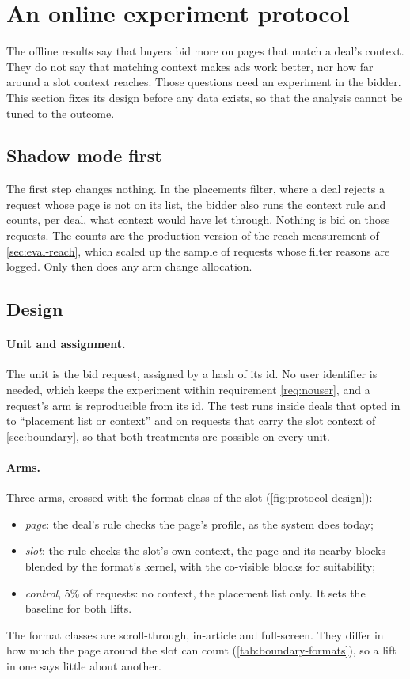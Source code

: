 \section{An online experiment protocol}\label{sec:protocol}

The offline results say that buyers bid more on pages that match a deal's context. They do not say that matching context makes ads work better, nor how far around a slot context reaches. Those questions need an experiment in the bidder. This section fixes its design before any data exists, so that the analysis cannot be tuned to the outcome.

\subsection{Shadow mode first}\label{sec:protocol-shadow}

The first step changes nothing. In the placements filter, where a deal rejects a request whose page is not on its list, the bidder also runs the context rule and counts, per deal, what context would have let through. Nothing is bid on those requests. The counts are the production version of the reach measurement of \cref{sec:eval-reach}, which scaled up the sample of requests whose filter reasons are logged. Only then does any arm change allocation.

\subsection{Design}\label{sec:protocol-design}

\paragraph{Unit and assignment.} The unit is the bid request, assigned by a hash of its id. No user identifier is needed, which keeps the experiment within requirement \ref{req:nouser}, and a request's arm is reproducible from its id. The test runs inside deals that opted in to ``placement list or context'' and on requests that carry the slot context of \cref{sec:boundary}, so that both treatments are possible on every unit.

\paragraph{Arms.} Three arms, crossed with the format class of the slot (\cref{fig:protocol-design}):
\begin{itemize}
\item \emph{page}: the deal's rule checks the page's profile, as the system does today;
\item \emph{slot}: the rule checks the slot's own context, the page and its nearby blocks blended by the format's kernel, with the co-visible blocks for suitability;
\item \emph{control}, 5\% of requests: no context, the placement list only. It sets the baseline for both lifts.
\end{itemize}
The format classes are scroll-through, in-article and full-screen. They differ in how much the page around the slot can count (\cref{tab:boundary-formats}), so a lift in one says little about another.

